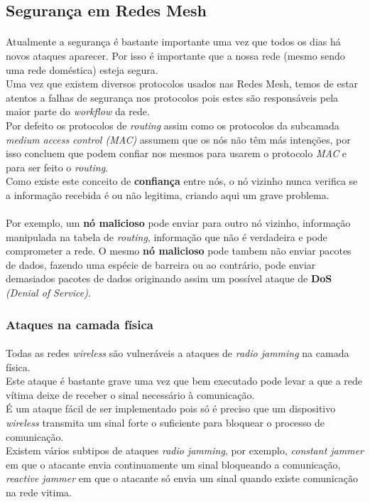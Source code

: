 \documentclass[letterpaper, 11pt]{article}
\begin{document}
\subsection{Segurança em Redes Mesh}
\label{sec:orgda9ff52}

\paragraph{}
Atualmente a segurança é bastante importante uma vez que todos os dias há novos ataques aparecer. Por isso é importante que a nossa rede (mesmo sendo uma rede doméstica) esteja segura.\\
Uma vez que existem diversos protocolos usados nas Redes Mesh, temos de estar atentos a falhas de segurança nos protocolos pois estes são responsáveis pela maior parte do \emph{workflow} da rede.\\
Por defeito os protocolos de \emph{routing} assim como os protocolos da subcamada \emph{medium access control (MAC)} assumem que os nós não têm más intenções, por isso concluem que podem confiar nos
mesmos para usarem o protocolo \emph{MAC} e para ser feito o \emph{routing}.\\
Como existe este conceito de \textbf{confiança} entre nós, o nó vizinho nunca verifica se a informação recebida é ou não legitima, criando aqui um grave problema.

\paragraph{}
Por exemplo, um \textbf{nó malicioso} pode enviar para outro nó vizinho, informação manipulada na tabela de \emph{routing}, informação que não é verdadeira e pode comprometer a rede. O mesmo \textbf{nó malicioso}
pode tambem não enviar pacotes de dados, fazendo uma espécie de barreira ou ao contrário, pode enviar demasiados pacotes de dados originando assim um possível ataque de \textbf{DoS} \emph{(Denial of Service)}.

\subsubsection{Ataques na camada física}
\label{sec:org45bacd0}

\paragraph{}
Todas as redes \emph{wireless} são vulneráveis a ataques de \emph{radio jamming} na camada física.\\
Este ataque é bastante grave uma vez que bem executado pode levar a que a rede vítima deixe de receber o sinal necessário à comunicação.\\
É um ataque fácil de ser implementado pois só é preciso que um dispositivo \emph{wireless} transmita um sinal forte o suficiente para bloquear o processo de comunicação.\\
Existem vários subtipos de ataques \emph{radio jamming}, por exemplo, \emph{constant jammer} em que o atacante envia continuamente um sinal bloqueando a comunicação, \emph{reactive jammer} em que o atacante
só envia um sinal quando existe comunicação na rede vitima.
\end{document}
